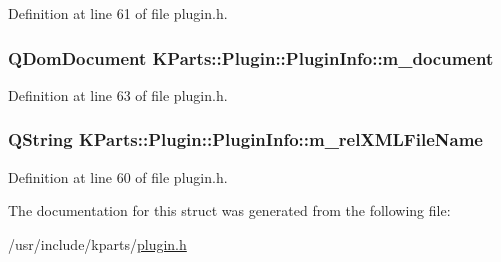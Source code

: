 Definition at line 61 of file plugin.\+h.

\hypertarget{structKParts_1_1Plugin_1_1PluginInfo_a5d8acab9612633d4d1f35019213ecadd}{
\subsubsection[{m\+\_\+document}]{\setlength{\rightskip}{0pt plus 5cm}Q\+Dom\+Document K\+Parts\+::\+Plugin\+::\+Plugin\+Info\+::m\+\_\+document}}\label{structKParts_1_1Plugin_1_1PluginInfo_a5d8acab9612633d4d1f35019213ecadd}


Definition at line 63 of file plugin.\+h.

\hypertarget{structKParts_1_1Plugin_1_1PluginInfo_a02f9a1972d5e87b2d168fa7c5683649b}{
\subsubsection[{m\+\_\+rel\+X\+M\+L\+File\+Name}]{\setlength{\rightskip}{0pt plus 5cm}Q\+String K\+Parts\+::\+Plugin\+::\+Plugin\+Info\+::m\+\_\+rel\+X\+M\+L\+File\+Name}}\label{structKParts_1_1Plugin_1_1PluginInfo_a02f9a1972d5e87b2d168fa7c5683649b}


Definition at line 60 of file plugin.\+h.



The documentation for this struct was generated from the following file\+:\begin{DoxyCompactItemize}
\item 
/usr/include/kparts/\hyperlink{plugin_8h}{plugin.\+h}\end{DoxyCompactItemize}
